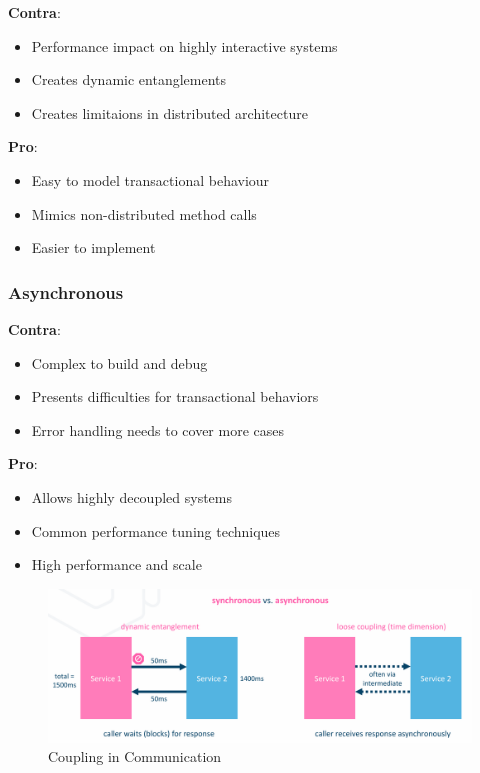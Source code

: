 \documentclass[../Main.tex]{subfiles}
\begin{document}
\begin{multicols}{2}
    \textbf{Contra}:
    \begin{itemize}
        \item Performance impact on highly interactive systems
        \item Creates dynamic entanglements
        \item Creates limitaions in distributed architecture
    \end{itemize}
    \columnbreak
    \textbf{Pro}:
    \begin{itemize}
        \item Easy to model transactional behaviour
        \item Mimics non-distributed method calls
        \item Easier to implement
    \end{itemize}
\end{multicols}
\subsubsection{Asynchronous}
\begin{multicols}{2}
    \textbf{Contra}:
    \begin{itemize}
        \item Complex to build and debug
        \item Presents difficulties for transactional behaviors
        \item Error handling needs to cover more cases
    \end{itemize}
    \textbf{Pro}:
    \begin{itemize}
        \item Allows highly decoupled systems
        \item Common performance tuning techniques
        \item High performance and scale
    \end{itemize}
\end{multicols}
\newpage

\begin{figure}[H]
    \centering
    \includegraphics[width=1\linewidth]{Images/coupling-comm.png}
    \caption{Coupling in Communication}
\end{figure}
\end{document}
